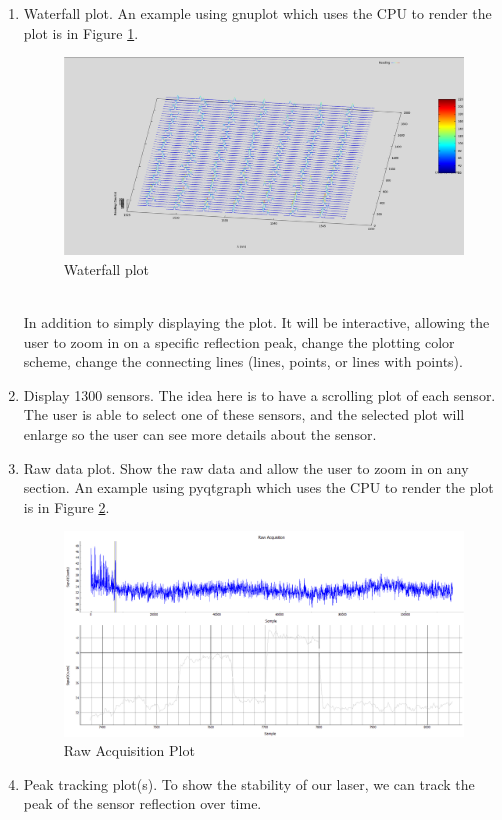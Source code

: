 \documentclass[10pt,letterpaper]{article}
\begin{document}
\begin{enumerate}
  \item Waterfall plot.  An example using gnuplot which uses the CPU to render the plot is in Figure \ref{fig:waterfallPlot}.
    \begin{figure}[h]
      \centering
      \includegraphics[scale=.25]{waterfallPlot}
      \caption{Waterfall plot}
      \label{fig:waterfallPlot}
    \end{figure}
    \\
    In addition to simply displaying the plot.  It will be interactive, allowing the user to zoom in on a specific reflection peak, change the plotting color scheme, change the connecting lines (lines, points, or lines with points).
  \item Display 1300 sensors.  The idea here is to have a scrolling plot of each sensor.  The user is able to select one of these sensors, and the selected plot will enlarge so the user can see more details about the sensor.
  \item Raw data plot.  Show the raw data and allow the user to zoom in on any section.  An example using pyqtgraph which uses the CPU to render the plot is in Figure \ref{fig:rawAcquisitionPlot}.
    \begin{figure}[h]
      \centering
      \includegraphics[scale=.42]{rawAcquisitionPlot}
      \caption{Raw Acquisition Plot}
      \label{fig:rawAcquisitionPlot}
    \end{figure}
  \item Peak tracking plot(s).  To show the stability of our laser, we can track the peak of the sensor reflection over time.
\end{enumerate}
\end{document}
